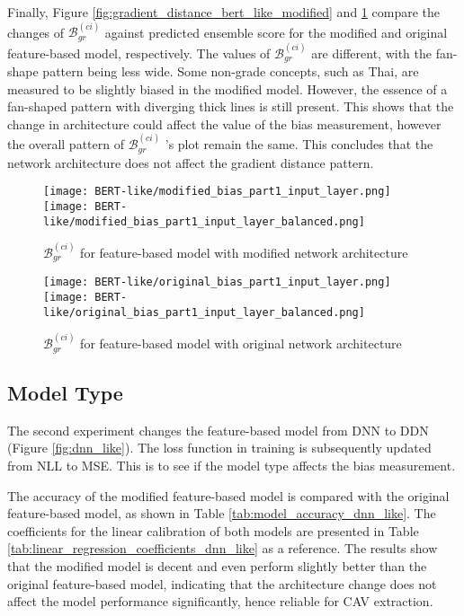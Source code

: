 Finally, Figure \ref{fig:gradient_distance_bert_like_modified} and \ref{fig:gradient_distance_bert_like_original} compare the changes of $\mathcal{B}^{(ci)}_{gr}$ against predicted ensemble score for the modified and original feature-based model, respectively. The values of $\mathcal{B}^{(ci)}_{gr}$ are different, with the fan-shape pattern being less wide. Some non-grade concepts, such as Thai, are measured to be slightly biased in the modified model. However, the essence of a fan-shaped pattern with diverging thick lines is still present. This shows that the change in architecture could affect the value of the bias measurement, however the overall pattern of $\mathcal{B}^{(ci)}_{gr}$ 's plot remain the same. This concludes that the network architecture does not affect the gradient distance pattern.

\begin{figure}[H]
    \centering
    \begin{minipage}[t]{0.48\textwidth}
        \centering
        \texttt{[image: BERT-like/modified\_bias\_part1\_input\_layer.png]}
        \hfill
        \texttt{[image: BERT-like/modified\_bias\_part1\_input\_layer\_balanced.png]}
        \caption{$\mathcal{B}^{(ci)}_{gr}$ for feature-based model with modified network architecture}
        \label{fig:gradient_distance_bert_like_modified}
    \end{minipage}
    \hfill
    \begin{minipage}[t]{0.48\textwidth}
        \centering
        \texttt{[image: BERT-like/original\_bias\_part1\_input\_layer.png]}
        \hfill
        \texttt{[image: BERT-like/original\_bias\_part1\_input\_layer\_balanced.png]}
        \caption{$\mathcal{B}^{(ci)}_{gr}$ for feature-based model with original network architecture}
        \label{fig:gradient_distance_bert_like_original}
    \end{minipage}
\end{figure}


\subsection{Model Type}
The second experiment changes the feature-based model from DNN to DDN (Figure \ref{fig:dnn_like}). The loss function in training is subsequently updated from NLL to MSE. This is to see if the model type affects the bias measurement.

The accuracy of the modified feature-based model is compared with the original feature-based model, as shown in Table \ref{tab:model_accuracy_dnn_like}. The coefficients for the linear calibration of both models are presented in Table \ref{tab:linear_regression_coefficients_dnn_like} as a reference. The results show that the modified model is decent and even perform slightly better than the original feature-based model, indicating that the architecture change does not affect the model performance significantly, hence reliable for CAV extraction.

